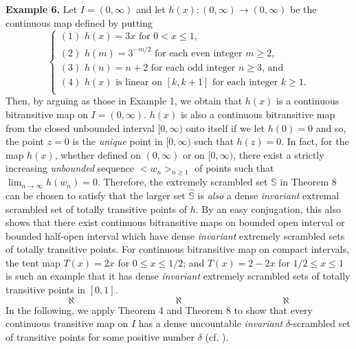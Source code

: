 \documentclass[12pt]{article}
\begin{document}
\noindent
{\bf Example 6.} Let $I = (0, \infty)$ and let $h(x) : (0, \infty) \rightarrow (0, \infty)$ be the continuous map defined by putting 
$$
\begin{cases}
(1) \,\, \text{$h(x) = 3x$ for $0 < x \le 1$}, \\
(2) \,\, \text{$h(m) = 3^{-m/2}$ for each even integer $m \ge 2$}, \\
(3) \,\, \text{$h(n) = n+2$ for each odd integer $n \ge 3$, and} \\
(4) \,\, \text{$h(x)$ is linear on $[k, k+1]$ for each integer $k \ge 1$}. \\
\end{cases}
$$
Then, by arguing as those in Example 1, we obtain that $h(x)$ is a continuous bitransitive map on $I = (0, \infty)$.  $h(x)$ is also a continuous bitransitive map from the closed unbounded interval $[0, \infty)$ onto itself if we let $h(0) = 0$ and so, the point $z = 0$ is the {\it unique} point in $[0, \infty)$ such that $h(z) = 0$. In fact, for the map $h(x)$, whether defined on $(0, \infty)$ or on $[0, \infty)$, there exist a strictly increasing {\it unbounded} sequence $<w_n>_{n \ge 1}$ of points such that $\lim_{n \to \infty} h(w_n) = 0$.  Therefore, the extremely scrambled set $\mathbb S$ in Theorem 8 can be chosen to satisfy that the larger set $\widehat {\mathbb S}$ is {\it also} a dense {\it invariant} extremal scrambled set of totally transitive points of $h$.  By an easy conjugation, this also shows that there exist continuous bitransitive maps on bounded open interval or bounded half-open interval which have dense {\it invariant} extremely scrambled sets of totally transitive points.  For continuous bitransitive map on compact intervals, the tent map $T(x) = 2x$ for $0 \le x \le 1/2$; and $T(x) = 2 - 2x$ for $1/2 \le x \le 1$ is such an example that it has dense {\it invariant} extremely scrambled sets of totally transitive points in $[0, 1]$.    
$$\aleph \qquad\qquad\qquad\qquad\qquad \aleph \qquad\qquad\qquad\qquad\qquad \aleph$$
\indent In the following, we apply Theorem 4 and Theorem 8 to show that every continuous transitive map on $I$ has a dense uncountable {\it invariant} $\delta$-scrambled set of transitive points for some positive number $\delta$ (cf. {\bf\cite{mai}}).
\end{document}
